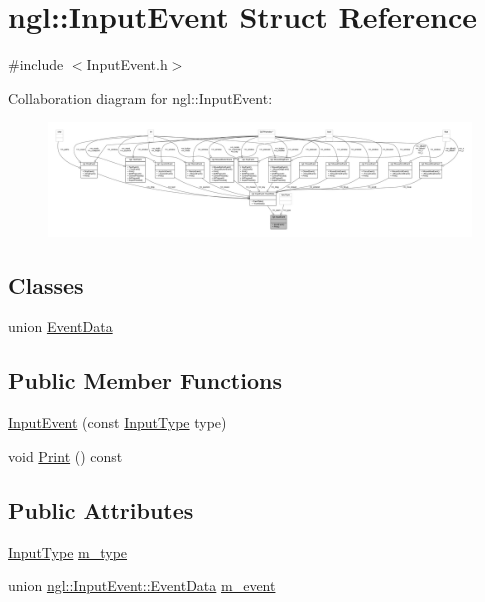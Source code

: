 \hypertarget{structngl_1_1_input_event}{}\section{ngl\+:\+:Input\+Event Struct Reference}
\label{structngl_1_1_input_event}


{\ttfamily \#include $<$Input\+Event.\+h$>$}



Collaboration diagram for ngl\+:\+:Input\+Event\+:
\nopagebreak
\begin{figure}[H]
\begin{center}
\leavevmode
\includegraphics[width=350pt]{structngl_1_1_input_event__coll__graph}
\end{center}
\end{figure}
\subsection*{Classes}
\begin{DoxyCompactItemize}
\item 
union \mbox{\hyperlink{unionngl_1_1_input_event_1_1_event_data}{Event\+Data}}
\end{DoxyCompactItemize}
\subsection*{Public Member Functions}
\begin{DoxyCompactItemize}
\item 
\mbox{\hyperlink{structngl_1_1_input_event_a03821e959cfba031b6e91571a5929f2a}{Input\+Event}} (const \mbox{\hyperlink{namespacengl_a5b20ff50635da5e3adb6bec00c062497}{Input\+Type}} type)
\item 
void \mbox{\hyperlink{structngl_1_1_input_event_a604620498739531ebf42c93af4987b35}{Print}} () const
\end{DoxyCompactItemize}
\subsection*{Public Attributes}
\begin{DoxyCompactItemize}
\item 
\mbox{\hyperlink{namespacengl_a5b20ff50635da5e3adb6bec00c062497}{Input\+Type}} \mbox{\hyperlink{structngl_1_1_input_event_a23021701bc6e144223dd1153060542f3}{m\+\_\+type}}
\item 
union \mbox{\hyperlink{unionngl_1_1_input_event_1_1_event_data}{ngl\+::\+Input\+Event\+::\+Event\+Data}} \mbox{\hyperlink{structngl_1_1_input_event_a54a6cdc9c78384f58288cc39e6539620}{m\+\_\+event}}
\end{DoxyCompactItemize}


